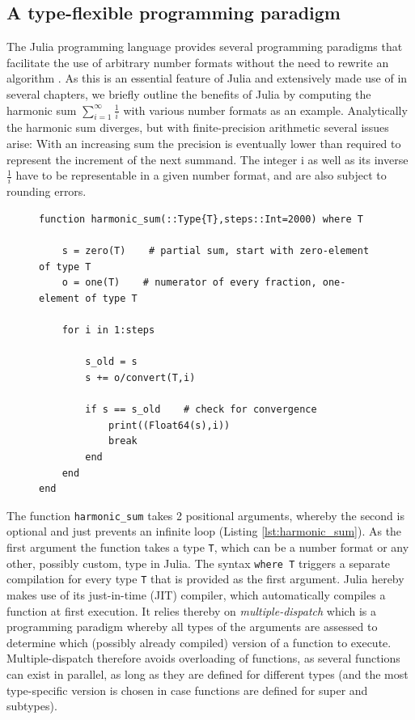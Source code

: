 \subsection{A type-flexible programming paradigm}

The Julia programming language provides several programming paradigms that facilitate the use of arbitrary number formats
without the need to rewrite an algorithm \citep{Bezanson2017}. As this is an essential feature of Julia and extensively made 
use of in several chapters, we briefly outline the benefits of Julia by computing the harmonic sum
$\sum_{i=1}^\infty \tfrac{1}{i}$ with various number formats as an example. Analytically the harmonic sum diverges, but with
finite-precision arithmetic several issues arise: With an increasing sum the precision is eventually lower than required to
represent the increment of the next summand. The integer i as well as its inverse $\tfrac{1}{i}$ have to be representable
in a given number format, and are also subject to rounding errors.

\begin{figure}[tbhp]
\begin{lstlisting}[language=JuliaLocal, label=lst:harmonic_sum, caption={\textbf{A type-flexible function calculating the harmonic sum in Julia.}
The number format is passed on as type in the first argument. The syntax \texttt{where T} triggers a separate compilation for every number
format. The function \texttt{harmonic\_sum} is type-stable as all types inside the function are declared and therefore unambiguous to the
compiler.}]
function harmonic_sum(::Type{T},steps::Int=2000) where T

    s = zero(T)    # partial sum, start with zero-element of type T
    o = one(T)    # numerator of every fraction, one-element of type T

    for i in 1:steps

        s_old = s
        s += o/convert(T,i)

        if s == s_old    # check for convergence
            print((Float64(s),i))
            break
        end
    end
end
\end{lstlisting}
\end{figure}

The function \texttt{harmonic\_sum} takes 2 positional arguments, whereby the second is optional and just prevents an
infinite loop (Listing \ref{lst:harmonic_sum}). As the first argument the function takes a type \texttt{T}, which can be a
number format or any other, possibly custom, type in Julia. The syntax \texttt{where T} triggers a separate compilation
for every type \texttt{T} that is provided as the first argument. Julia hereby makes use of its just-in-time (JIT) compiler,
which automatically compiles a function at first execution. It relies thereby on \emph{multiple-dispatch} which is a
programming paradigm whereby all types of the arguments are assessed to determine which (possibly already compiled)
version of a function to execute. Multiple-dispatch therefore avoids overloading of functions, as several functions
can exist in parallel, as long as they are defined for different types (and the most type-specific version is chosen in
case functions are defined for super and subtypes).


